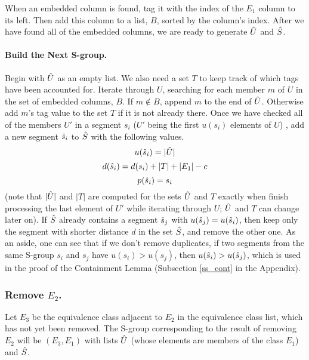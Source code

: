 When an embedded column is found, tag it with the index of the $E_1$ column to its left.
Then add this column to a list, $B$, sorted by the column's index.
After we have found all of the embedded columns, we are ready to generate $\hat{U}$ and $\hat{S}$.

\paragraph{Build the Next S-group.}
Begin with $\hat{U}$ as an empty list.
We also need a set $T$ to keep track of which tags have been accounted for.
Iterate through $U$, searching for each member $m$ of $U$
 in the set of embedded columns, $B$.
If $m\not \in B$, append $m$ to the end of $\hat{U}$.
Otherwise add $m$'s tag value to the set $T$ if it is not already there. %
Once we have checked all of the members $U'$  in a segment $s_i$
($U'$ being the first $u(s_i)$ elements of $U$) ,
add a new segment $\hat{s}_i$ to $\hat{S}$ with the following values.
$$u(\hat{s}_i) = |\hat{U}|$$
$$d(\hat{s}_i)  = d(s_i) + |T| + |E_1| - c$$
$$p(\hat{s}_i)  = s_i$$
(note that $|\hat{U}|$ and $|T|$ are computed for the sets  $\hat{U}$ and $T$ exactly
when finish processing the last element of $U'$ while iterating through $U$;
$\hat{U}$ and $T$ can change later on).
If $\hat{S}$ already contains a segment $\hat{s}_j$ with $u(\hat{s}_j) = u(\hat{s}_i)$,
then keep only the segment with shorter distance $d$ in the set $\hat{S}$,
 and remove the other one. %
As an aside, one can see that if we don't remove duplicates,
if two segments from the same S-group $s_i$ and $s_j$ have
$u(s_i) > u(s_j)$,  then
$u(\hat{s}_i) > u(\hat{s}_j)$,  which is used in the proof of the
Containment Lemma (Subsection \ref{ss_cont} in the Appendix).

\subsubsection{Remove $E_2$.}
Let $E_3$ be the equivalence class adjacent to $E_2$ in the equivalence class list, which has not yet been removed.
The S-group corresponding to the result of removing $E_2$ will be $(E_3,E_1)$ with lists $\hat{U}$ (whose elements are members of the class $E_1$) and $\hat{S}$.


